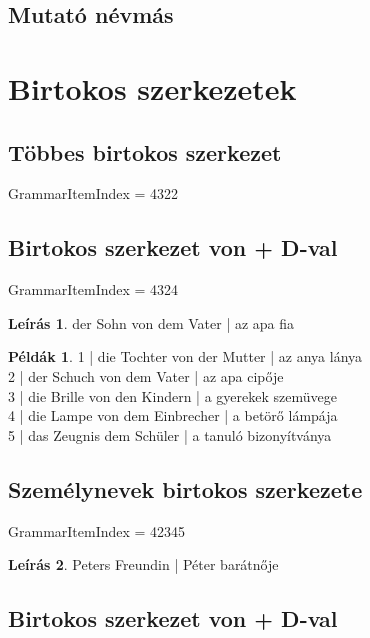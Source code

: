 \documentclass{article}
\theoremstyle{definition}
\newtheorem*{exmp}{Példák}
\newtheorem*{desc}{Leírás}
\begin{document}
\subsection{Mutató névmás}

\section{Birtokos szerkezetek}

\subsection{Többes birtokos szerkezet}

GrammarItemIndex = 4322

\subsection{Birtokos szerkezet von + D-val}

GrammarItemIndex = 4324

\begin{desc}
der Sohn von dem Vater | az apa fia
\end{desc}

\begin{exmp}
1 | die Tochter von der Mutter | az anya lánya\\
2 | der Schuch von dem Vater | az apa cipője\\
3 | die Brille von den Kindern | a gyerekek szemüvege\\
4 | die Lampe von dem Einbrecher | a betörő lámpája\\
5 | das Zeugnis dem  Schüler | a tanuló bizonyítványa\\
\end{exmp}

\subsection{Személynevek birtokos szerkezete}

GrammarItemIndex = 42345

\begin{desc}
Peters Freundin | Péter barátnője
\end{desc}

\subsection{Birtokos szerkezet von + D-val}
\end{document}
